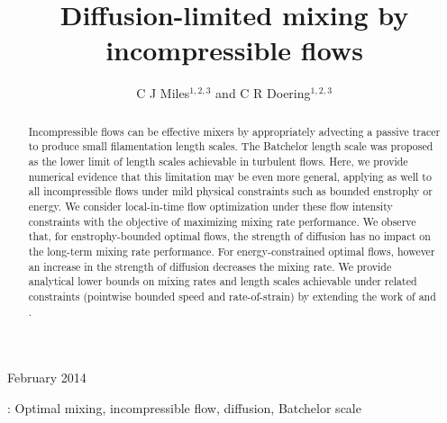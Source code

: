 \documentclass[12pt]{iopart}
\begin{document}
\title[Diffusion-limited mixing by incompressible flows]{Diffusion-limited mixing by incompressible flows}

\author{C J Miles$^{1,2,3}$ and C R Doering$^{1,2,3}$ }

\address{$^1$ Department of Physics, University of Michigan,
Ann Arbor, MI 48104-1040, USA}
\address{$^2$ Department of Mathematics, University of Michigan,
Ann Arbor, MI 48104-1043, USA}
\address{$^3$ Center for the Study of Complex Systems, University of Michigan,
Ann Arbor, MI 48104-1107, USA}
\vspace{10pt}
\begin{indented}
\item[]February 2014
\end{indented}

\begin{abstract}
Incompressible flows can be effective mixers by appropriately advecting a passive tracer to produce small filamentation length scales. The Batchelor length scale \cite{Batchelor1959a} was proposed as the lower limit of length scales achievable in turbulent flows. Here, we provide numerical evidence that this limitation may be even more general, applying as well to all incompressible flows under mild physical constraints such as bounded enstrophy or energy. We consider local-in-time flow optimization under these flow intensity constraints with the objective of maximizing mixing rate performance. We observe that, for enstrophy-bounded optimal flows, the strength of diffusion has no impact on the long-term mixing rate performance. For energy-constrained optimal flows, however an increase in the strength of diffusion decreases the mixing rate. We provide analytical lower bounds on mixing rates and length scales achievable under related constraints (pointwise bounded speed and rate-of-strain) by extending the work of \cite{JFM2011} and \cite{Chi-Cheu1996}. 

\end{abstract}

%
\vspace{2pc}
: Optimal mixing, incompressible flow, diffusion, Batchelor scale

\submitto{\NL}
%
% 
%
\end{document}
